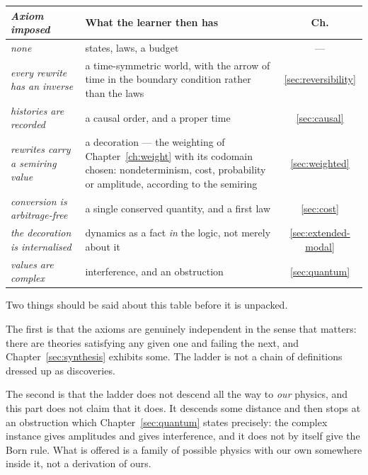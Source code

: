 \begin{center}
\renewcommand{\arraystretch}{1.3}
\begin{tabular}{>{\itshape}p{4.4cm} p{5.4cm} c}
\toprule
\normalfont\textbf{Axiom imposed} & \textbf{What the learner then has} & \textbf{Ch.} \\
\midrule
none
  & states, laws, a budget
  & --- \\
every rewrite has an inverse
  & a time-symmetric world, with the arrow of time in the boundary
    condition rather than the laws
  & \ref{sec:reversibility} \\
histories are recorded
  & a causal order, and a proper time
  & \ref{sec:causal} \\
rewrites carry a semiring value
  & a decoration --- the weighting of Chapter~\ref{ch:weight} with its
    codomain chosen: nondeterminism, cost, probability or amplitude,
    according to the semiring
  & \ref{sec:weighted} \\
conversion is arbitrage-free
  & a single conserved quantity, and a first law
  & \ref{sec:cost} \\
the decoration is internalised
  & dynamics as a fact \emph{in} the logic, not merely about it
  & \ref{sec:extended-modal} \\
values are complex
  & interference, and an obstruction
  & \ref{sec:quantum} \\
\bottomrule
\end{tabular}
\end{center}

Two things should be said about this table before it is unpacked.

The first is that the axioms are genuinely independent in the sense that
matters: there are theories satisfying any given one and failing the
next, and Chapter~\ref{sec:synthesis} exhibits some.
The ladder is not a chain of definitions dressed up as discoveries.

The second is that the ladder does not descend all the way to
\emph{our} physics, and this part does not claim that it does.
It descends some distance and then stops at an obstruction which
Chapter~\ref{sec:quantum} states precisely: the complex instance gives
amplitudes and gives interference, and it does not by itself give the
Born rule.
What is offered is a family of possible physics with our own somewhere
inside it, not a derivation of ours.

